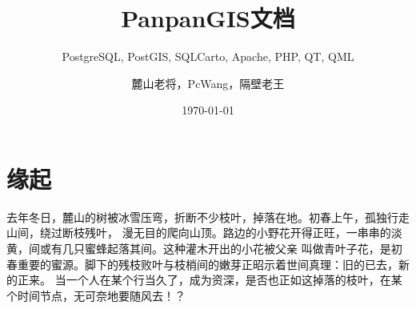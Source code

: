 \documentclass[lang=cn,newtx,10pt,scheme=chinese]{panpangis}
\title{PanpanGIS文档}
\subtitle{PostgreSQL, PostGIS, SQLCarto, Apache, PHP, QT, QML}
\author{麓山老将，PcWang，隔壁老王}
\institute{CSU.GIS.250 + 1}
\date{\today}
\begin{document}
\maketitle
\frontmatter

\tableofcontents

\mainmatter

\chapter{缘起}

去年冬日，麓山的树被冰雪压弯，折断不少枝叶，掉落在地。初春上午，孤独行走山间，绕过断枝残叶，
漫无目的爬向山顶。路边的小野花开得正旺，一串串的淡黄，间或有几只蜜蜂起落其间。这种灌木开出的小花被父亲
叫做青叶子花，是初春重要的蜜源。脚下的残枝败叶与枝梢间的嫩芽正昭示着世间真理：旧的已去，新的正来。
当一个人在某个行当久了，成为资深，是否也正如这掉落的枝叶，在某个时间节点，无可奈地要随风去！？
\end{document}
